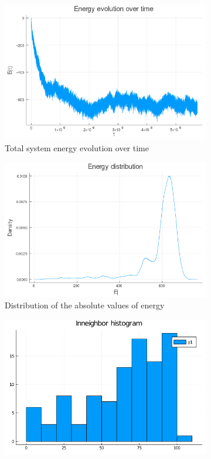 \documentclass[12pt,openright,twoside]{book}
\begin{document}
\begin{appendices}
\begin{figure}[!htb]
\centering
\begin{subfigure}{0.47\linewidth}
    \includegraphics[width=\linewidth]{figures/2_2_t10/energy_evolution.png}
    \caption{Total system energy evolution over time}
\end{subfigure}
\begin{subfigure}{0.47\linewidth}
    \includegraphics[width=\linewidth]{figures/2_2_t10/energy_distribution.png}
    \caption{Distribution of the absolute values of energy}
\end{subfigure}
\begin{subfigure}{0.47\linewidth}
    \includegraphics[width=\linewidth]{figures/2_2_t10/InneighborHistogram_temp=10.png}

\end{subfigure}
\end{figure}
\end{appendices}
\end{document}
